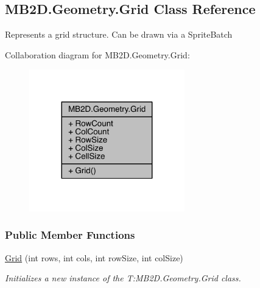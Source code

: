 \hypertarget{class_m_b2_d_1_1_geometry_1_1_grid}{}\subsection{M\+B2\+D.\+Geometry.\+Grid Class Reference}
\label{class_m_b2_d_1_1_geometry_1_1_grid}


Represents a grid structure. Can be drawn via a Sprite\+Batch  




Collaboration diagram for M\+B2\+D.\+Geometry.\+Grid\+:
\nopagebreak
\begin{figure}[H]
\begin{center}
\leavevmode
\includegraphics[width=191pt]{class_m_b2_d_1_1_geometry_1_1_grid__coll__graph}
\end{center}
\end{figure}
\subsubsection*{Public Member Functions}
\begin{DoxyCompactItemize}
\item 
\hyperlink{class_m_b2_d_1_1_geometry_1_1_grid_a7ff870c0156e2fb0fc5fffe081db4a10}{Grid} (int rows, int cols, int row\+Size, int col\+Size)
\begin{DoxyCompactList}\small\item\em Initializes a new instance of the T\+:\+M\+B2\+D.\+Geometry.\+Grid class. \end{DoxyCompactList}\end{DoxyCompactItemize}
